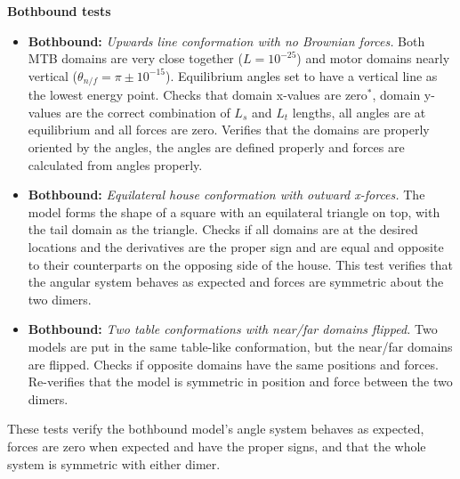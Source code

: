 \documentclass[
11pt, %
english, %
singlespacing, %
headsepline, %
chapterinoneline, %
]{MastersDoctoralThesis} %
\begin{document}
\textbf{Bothbound tests}
\begin{itemize}
\item \textbf{Bothbound:} \textit{Upwards line conformation with no Brownian forces.} Both MTB domains are very close together ($L=10^{-25}$) and motor domains nearly vertical ($\theta_{n/f} = \pi \pm 10^{-15}$). Equilibrium angles set to have a vertical line as the lowest energy point. Checks that domain x-values are zero$^*$, domain y-values are the correct combination of $L_s$ and $L_t$ lengths, all angles are at equilibrium and all forces are zero. Verifies that the domains are properly oriented by the angles, the angles are defined properly and forces are calculated from angles properly.
\item \textbf{Bothbound:} \textit{Equilateral house conformation with outward x-forces.} The model forms the shape of a square with an equilateral triangle on top, with the tail domain as the triangle. Checks if all domains are at the desired locations and the derivatives are the proper sign and are equal and opposite to their counterparts on the opposing side of the house. This test verifies that the angular system behaves as expected and forces are symmetric about the two dimers.
\item \textbf{Bothbound:} \textit{Two table conformations with near/far domains flipped.} Two models are put in the same table-like conformation, but the near/far domains are flipped. Checks if opposite domains have the same positions and forces. Re-verifies that the model is symmetric in position and force between the two dimers.
\end{itemize}

These tests verify the bothbound model's angle system behaves as expected, forces are zero when expected and have the proper signs, and that the whole system is symmetric with either dimer.


\printbibliography[heading=bibintoc]

\end{document}
